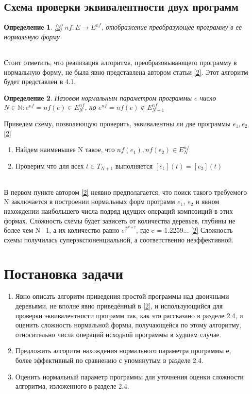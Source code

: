 \documentclass[12pt]{article}
\newtheorem{defn}{Определение}[section]
\begin{document}
\subsection{Схема проверки эквивалентности двух программ}
\begin{defn} \hyperlink{bibl2}{[2]} $nf: E \rightarrow E^{nf}$, отображение преобразующее программу в ее нормальную форму \end{defn}\\
Стоит отметить, что реализация алгоритма, преобразовывающего программу в нормальную форму, не была явно представлена автором статьи \hyperlink{bibl2}{[2]}. Этот алгоритм будет представлен в 4.1.\\
\begin{defn} Назовем \emph{нормальным параметром} программы \(e\) число $N \in \mathbb{N}: e^{nf}=nf(e) \in E^{nf}_{N}$, но $e^{nf}=nf(e) \notin E^{nf}_{N-1}$ \end{defn}
Приведем схему, позволяющую проверить, эквивалентны ли две программы \(e_{1}, e_{2}\) \hyperlink{bibl2}{[2]}\\
\begin{enumerate}
\item Найдем наименьшее N такое, что $nf(e_{1}), nf(e_{2}) \in E_{N}^{nf}$
\item Проверим что для всех $t \in T_{N+1}$ выполняется $[e_{1}](t) = [e_{2}](t)$
\end{enumerate}\\
В первом пункте автором \hyperlink{bibl2}{[2]} неявно предполагается, что поиск такого требуемого N заключается в построении нормальных форм программ $e_{1}$, $e_{2}$ и явном нахождении наибольшего числа подряд идущих операций композиций в этих формах. Сложность схемы будет зависеть от количества деревьев, глубины не более чем N+1, а их  количество равно $c^{2^{N+2}}$, где c = 1.2259... \hyperlink{bibl2}{[2]} Сложность схемы получилась суперэкспоненциальной, а соответственно неэффективной.\\
\pagebreak

\section{Постановка задачи}
\begin{enumerate}
\item Явно описать алгоритм приведения простой программы над двоичными деревьями, не вполне явно приведённый в \hyperlink{bibl2}{[2]}, и использующийся для проверки эквивалентности программ так, как это рассказано в разделе 2.4,  и оценить сложность нормальной формы, получающейся по этому алгоритму, относительно числа операций исходной программы в худшем случае.
\item Предложить алгоритм нахождения нормального параметра программы е, более эффективный по сравнению с упомянутым в разделе 2.4.
\item Оценить нормальный параметр программы для уточнения оценки сложности алгоритма, изложенного в разделе 2.4.
\end{enumerate}
\pagebreak
\end{document}

